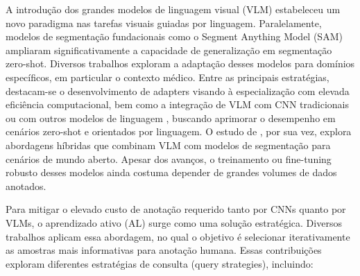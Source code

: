 A introdução dos grandes modelos de linguagem visual (\ac{VLM}) estabeleceu um novo paradigma nas tarefas visuais guiadas por linguagem. Paralelamente, modelos de segmentação fundacionais como o Segment Anything Model (SAM) ampliaram significativamente a capacidade de generalização em segmentação zero-shot. Diversos trabalhos exploram a adaptação desses modelos para domínios específicos, em particular o contexto médico. Entre as principais estratégias, destacam-se o desenvolvimento de adapters \cite{wu2023medical, huang2024adapting} visando à especialização com elevada eficiência computacional, bem como a integração de \ac{VLM} com \ac{CNN} tradicionais \cite{gowda2024ccsam} ou com outros modelos de linguagem \cite{koleilat2024medclipsamv2}, buscando aprimorar o desempenho em cenários zero-shot e orientados por linguagem. O estudo de , por sua vez, explora abordagens híbridas que combinam \ac{VLM} com modelos de segmentação para cenários de mundo aberto. Apesar dos avanços, o treinamento ou fine-tuning robusto desses modelos ainda costuma depender de grandes volumes de dados anotados.



Para mitigar o elevado custo de anotação requerido tanto por \ac{CNN}s quanto por \ac{VLM}s, o aprendizado ativo (\ac{AL}) surge como uma solução estratégica. Diversos trabalhos \cite{xie2022ripu, zheng2024alintro, konyushkova2017learning, kim2023adaptive, mackowiak2018cereals, rangnekar2022region, franco2023halo} aplicam essa abordagem, no qual o objetivo é selecionar iterativamente as amostras mais informativas para anotação humana. Essas contribuições exploram diferentes estratégias de consulta (query strategies), incluindo:

